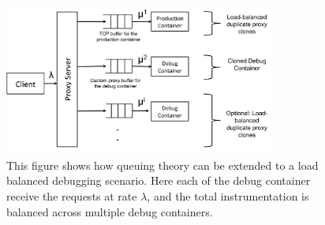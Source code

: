 \begin{figure}[h!]
	\begin{center}
		\includegraphics[width=0.8\textwidth]{queue/figs/queueBalanced.pdf}
		\caption{This figure shows how queuing theory can be extended to a load balanced debugging scenario. Here each of the debug container receive the requests at rate $\lambda$, and the total instrumentation is balanced across multiple debug containers.}
		\label{fig:queueBalanced}
	\end{center}
\end{figure}


